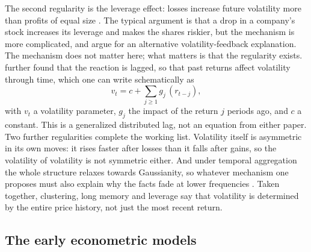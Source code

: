 \documentclass[12pt,a4paper]{article}
\begin{document}
The second regularity is the leverage effect: losses increase future
volatility more than profits of equal size \citep{bekaertwu2000,
bouchaud2001}. The typical argument is that a drop in a company's stock
increases its leverage and makes the shares riskier, but the mechanism is
more complicated, and \citet{bekaertwu2000} argue for an alternative
volatility-feedback explanation. The mechanism does not matter here; what
matters is that the regularity exists. \citet{bouchaud2001} further found
that the reaction is lagged, so that past returns affect volatility
through time, which one can write schematically as
\begin{equation}
v_t = c + \sum_{j \geq 1} g_j\,(r_{t-j}),
\end{equation}
with $v_t$ a volatility parameter, $g_j$ the impact of the return $j$
periods ago, and $c$ a constant. This is a generalized distributed lag,
not an equation from either paper. Two further regularities complete the working list. Volatility itself
is asymmetric in its own moves: it rises faster after losses than it
falls after gains, so the volatility of volatility is not symmetric
either. And under temporal aggregation the whole structure relaxes
towards Gaussianity, so whatever mechanism one proposes must also
explain why the facts fade at lower frequencies \citep{cont2001}. Taken
together, clustering, long
memory and leverage say that volatility is determined by the entire price
history, not just the most recent return.

\subsection{The early econometric models}
\end{document}
